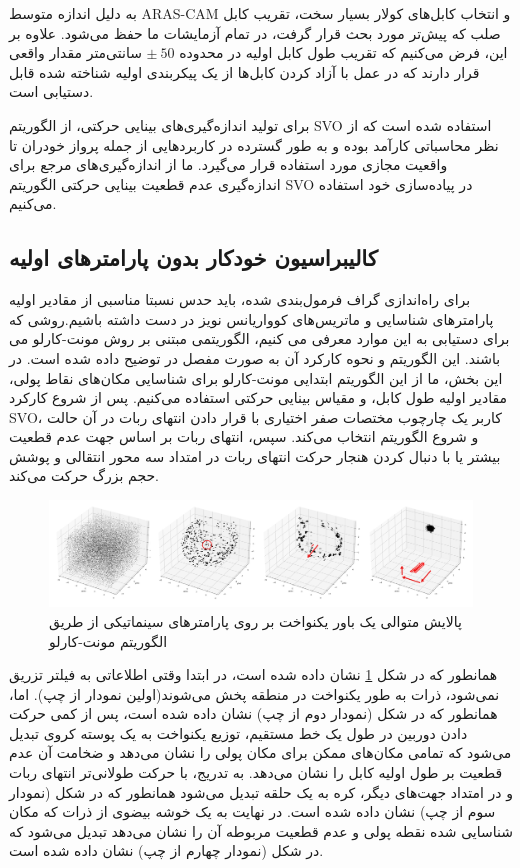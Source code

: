 به دلیل اندازه متوسط ARAS-CAM و انتخاب کابل‌های کولار بسیار سخت، تقریب کابل صلب که پیش‌تر مورد بحث قرار گرفت، در تمام آزمایشات ما حفظ می‌شود. علاوه بر این، فرض می‌کنیم که تقریب طول کابل اولیه در محدوده 
$\pm~50$
سانتی‌متر مقدار واقعی قرار دارند که در عمل با آزاد کردن کابل‌ها از یک پیکربندی اولیه شناخته شده قابل دستیابی است.

برای تولید اندازه‌گیری‌های بینایی حرکتی، از الگوریتم SVO
\cite{Forster2014ICRA}
استفاده شده است که از نظر محاسباتی کارآمد بوده و به طور گسترده در کاربردهایی از جمله پرواز خودران تا واقعیت مجازی مورد استفاده قرار می‌گیرد. ما از اندازه‌گیری‌های مرجع برای اندازه‌گیری عدم قطعیت بینایی حرکتی الگوریتم SVO در پیاده‌سازی خود استفاده می‌کنیم.

\subsection{کالیبراسیون خودکار بدون پارامترهای اولیه} \label{seq:monte_carlo}
برای راه‌اندازی گراف فرمول‌بندی شده، باید حدس نسبتا مناسبی از مقادیر اولیه پارامتر‌های شناسایی و ماتریس‌های کوواریانس نویز در دست داشته باشیم.روشی که برای دستیابی به این موارد معرفی می کنیم، الگوریتمی مبتنی بر روش مونت-کارلو می باشند. این الگوریتم و نحوه کارکرد آن به صورت مفصل در 
\cite{khorrambakht2023graph}
توضیح داده شده است. در این بخش، ما از این الگوریتم ابتدایی مونت-کارلو برای شناسایی مکان‌های نقاط پولی، مقادیر اولیه طول کابل، و مقیاس بینایی حرکتی استفاده می‌کنیم. پس از شروع کارکرد SVO، کاربر یک چارچوب مختصات صفر اختیاری با قرار دادن انتهای ربات در آن حالت و شروع الگوریتم انتخاب می‌کند. سپس، انتهای ربات بر اساس جهت عدم قطعیت بیشتر یا با دنبال کردن هنجار حرکت انتهای ربات در امتداد سه محور انتقالی و پوشش حجم بزرگ حرکت می‌کند.

\begin{figure}
	\centering
	\includegraphics[width=1\linewidth]{img/monte_carlo}
	\caption{پالایش متوالی یک باور یکنواخت بر روی پارامترهای سینماتیکی از طریق الگوریتم مونت-کارلو}
	\label{fig:montecarlo}
\end{figure}

همانطور که در شکل 
\ref{fig:montecarlo}
نشان داده شده است، در ابتدا وقتی اطلاعاتی به فیلتر تزریق نمی‌شود، ذرات به طور یکنواخت در منطقه پخش می‌شوند(اولین نمودار از چپ). اما، همانطور که در شکل (نمودار دوم از چپ) نشان داده شده است، پس از کمی حرکت دادن دوربین در طول یک خط مستقیم، توزیع یکنواخت به یک پوسته کروی تبدیل می‌شود که تمامی مکان‌های ممکن برای مکان پولی را نشان می‌دهد و ضخامت آن عدم قطعیت بر طول اولیه کابل را نشان می‌دهد. به تدریج، با حرکت طولانی‌تر انتهای ربات و در امتداد جهت‌های دیگر، کره به یک حلقه تبدیل می‌شود همانطور که در شکل (نمودار سوم از چپ) نشان داده شده است. در نهایت به یک خوشه بیضوی از ذرات که مکان شناسایی شده نقطه پولی و عدم قطعیت مربوطه آن را نشان می‌دهد تبدیل می‌شود که در شکل (نمودار چهارم از چپ) نشان داده شده است.

